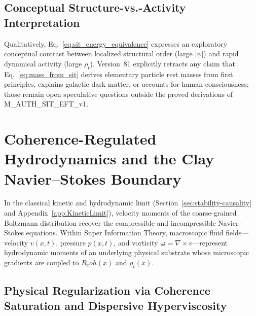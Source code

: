 \documentclass[american,11pt,letterpaper]{article}
\newcommand{\Rcoh}{R_{\mathrm{coh}}}
\def\mathbf#1{#1}%
\def\mathrm#1{#1}%
\def\texttt#1{#1}%
\def\Rcoh{R_coh}%
\begin{document}
\subsection{Conceptual Structure-vs.-Activity Interpretation}

Qualitatively, Eq.~\eqref{eq:sit_energy_equivalence} expresses an exploratory conceptual contrast between localized structural order (large $|\psi|$) and rapid dynamical activity (large $\rho_t$). Version~81 explicitly retracts any claim that Eq.~\eqref{eq:mass_from_sit} derives elementary particle rest masses from first principles, explains galactic dark matter, or accounts for human consciousness; those remain open speculative questions outside the proved derivations of \texttt{M\_AUTH\_SIT\_EFT\_v1}.



\section{Coherence-Regulated Hydrodynamics and the Clay Navier--Stokes Boundary}
\label{sec:navier-stokes-boundary}

In the classical kinetic and hydrodynamic limit (Section~\ref{sec:stability-causality} and Appendix~\ref{app:KineticLimit}), velocity moments of the coarse-grained Boltzmann distribution recover the compressible and incompressible Navier--Stokes equations. Within Super Information Theory, macroscopic fluid fields---velocity $\mathbf{v}(\mathbf{x},t)$, pressure $p(\mathbf{x},t)$, and vorticity $\boldsymbol{\omega} = \nabla \times \mathbf{v}$---represent hydrodynamic moments of an underlying physical substrate whose microscopic gradients are coupled to $\Rcoh(x)$ and $\rho_t(x)$.

\subsection{Physical Regularization via Coherence Saturation and Dispersive Hyperviscosity}
\end{document}
